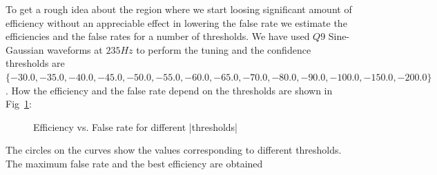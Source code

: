 \documentclass[10pt]{article}
\begin{document}
To get a rough idea about the region where we start loosing significant 
amount of efficiency without an appreciable effect in lowering the false 
rate we estimate the efficiencies and the false rates for a number of 
thresholds. We have used $Q9$ Sine-Gaussian waveforms at $235 Hz $ to
perform the tuning and the confidence thresholds are
$\{-30.0, -35.0, -40.0, -45.0, -50.0, -55.0, -60.0, -65.0, -70.0, -80.0, 
-90.0, -100.0, -150.0, -200.0\}$. How the efficiency and the false rate 
depend on the thresholds are shown in Fig~\ref{fig:dt125df128tune}: 
\begin{figure}
\begin{center}
\caption{Efficiency vs. False rate for different |thresholds|}
\label{fig:dt125df128tune}
\end{center}
\end{figure}
The circles on the curves show the values corresponding to different 
thresholds.  The maximum false rate and the best efficiency are obtained 
\end{document}
